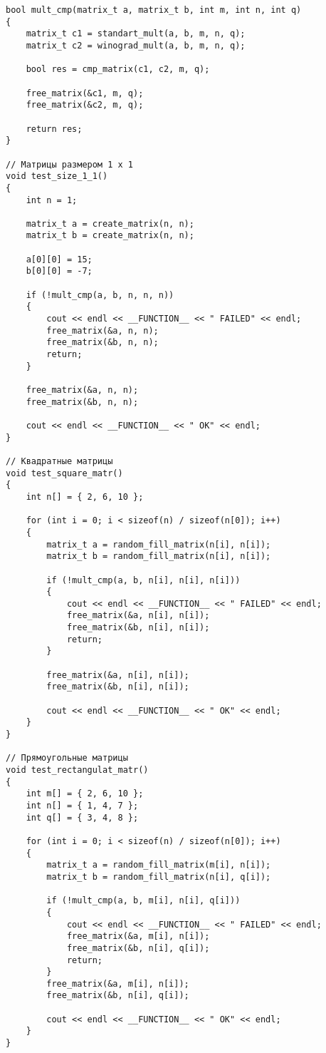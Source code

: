 \begin{lstlisting}[label=code, caption = Тесты]
bool mult_cmp(matrix_t a, matrix_t b, int m, int n, int q)
{
	matrix_t c1 = standart_mult(a, b, m, n, q);
	matrix_t c2 = winograd_mult(a, b, m, n, q);
	
	bool res = cmp_matrix(c1, c2, m, q);
	
	free_matrix(&c1, m, q);
	free_matrix(&c2, m, q);
	
	return res;
}

// Матрицы размером 1 х 1
void test_size_1_1()
{
	int n = 1;
	
	matrix_t a = create_matrix(n, n);
	matrix_t b = create_matrix(n, n);
	
	a[0][0] = 15;
	b[0][0] = -7;
	
	if (!mult_cmp(a, b, n, n, n))
	{
		cout << endl << __FUNCTION__ << " FAILED" << endl;
		free_matrix(&a, n, n);
		free_matrix(&b, n, n);
		return;
	}
	
	free_matrix(&a, n, n);
	free_matrix(&b, n, n);
	
	cout << endl << __FUNCTION__ << " OK" << endl;
}

// Квадратные матрицы
void test_square_matr()
{
	int n[] = { 2, 6, 10 };
	
	for (int i = 0; i < sizeof(n) / sizeof(n[0]); i++)
	{
		matrix_t a = random_fill_matrix(n[i], n[i]);
		matrix_t b = random_fill_matrix(n[i], n[i]);
		
		if (!mult_cmp(a, b, n[i], n[i], n[i]))
		{
			cout << endl << __FUNCTION__ << " FAILED" << endl;
			free_matrix(&a, n[i], n[i]);
			free_matrix(&b, n[i], n[i]);
			return;
		}
		
		free_matrix(&a, n[i], n[i]);
		free_matrix(&b, n[i], n[i]);
		
		cout << endl << __FUNCTION__ << " OK" << endl;
	}
}

// Прямоугольные матрицы
void test_rectangulat_matr()
{
	int m[] = { 2, 6, 10 };
	int n[] = { 1, 4, 7 };
	int q[] = { 3, 4, 8 };
	
	for (int i = 0; i < sizeof(n) / sizeof(n[0]); i++)
	{
		matrix_t a = random_fill_matrix(m[i], n[i]);
		matrix_t b = random_fill_matrix(n[i], q[i]);
		
		if (!mult_cmp(a, b, m[i], n[i], q[i]))
		{
			cout << endl << __FUNCTION__ << " FAILED" << endl;
			free_matrix(&a, m[i], n[i]);
			free_matrix(&b, n[i], q[i]);
			return;
		}
		free_matrix(&a, m[i], n[i]);
		free_matrix(&b, n[i], q[i]);
		
		cout << endl << __FUNCTION__ << " OK" << endl;
	}
}


\end{lstlisting}
